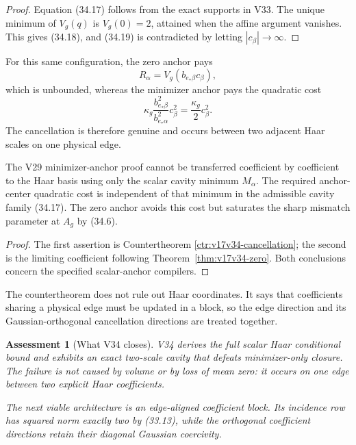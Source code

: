 \documentclass[11pt]{article}
\newtheorem{assessment}[theorem]{Assessment}
\theoremstyle{remark}
\begin{document}
\begin{proof}
Equation (34.17) follows from the exact supports in V33.  The unique
minimum of \(V_g(q)\) is \(V_g(0)=2\), attained when the affine
argument vanishes.  This gives (34.18), and (34.19) is contradicted by
letting \(|c_\beta|\to\infty\).
\end{proof}

For this same configuration, the zero anchor pays
\[
 R_\alpha=V_g(b_{e_*\beta}c_\beta),                \tag{34.20}
\]
which is unbounded, whereas the minimizer anchor pays the quadratic
cost
\[
 \kappa_g\frac{b_{e_*\beta}^2}{b_{e_*\alpha}^2}
 c_\beta^2=\frac{\kappa_g}{2}c_\beta^2.            \tag{34.21}
\]
The cancellation is therefore genuine and occurs between two adjacent
Haar scales on one physical edge.

\begin{countertheorem}
\label{ctr:v17v34-scalar}
The V29 minimizer-anchor proof cannot be transferred coefficient by
coefficient to the Haar basis using only the scalar cavity minimum
\(M_\alpha\).  The required anchor-center quadratic cost is independent
of that minimum in the admissible cavity family (34.17).  The zero
anchor avoids this cost but saturates the sharp mismatch parameter at
\(A_g\) by (34.6).
\end{countertheorem}

\begin{proof}
The first assertion is Countertheorem
\ref{ctr:v17v34-cancellation}; the second is the limiting coefficient
following Theorem~\ref{thm:v17v34-zero}.  Both conclusions concern the
specified scalar-anchor compilers.
\end{proof}

The countertheorem does not rule out Haar coordinates.  It says that
coefficients sharing a physical edge must be updated in a block, so the
edge direction and its Gaussian-orthogonal cancellation directions are
treated together.

\begin{assessment}[What V34 closes]
\label{ass:v17v34-status}
V34 derives the full scalar Haar conditional bound and exhibits an
exact two-scale cavity that defeats minimizer-only closure.  The failure
is not caused by volume or by loss of mean zero: it occurs on one edge
between two explicit Haar coefficients.

The next viable architecture is an edge-aligned coefficient block.  Its
incidence row has squared norm exactly two by (33.13), while the
orthogonal coefficient directions retain their diagonal Gaussian
coercivity.
\end{assessment}
\end{document}
